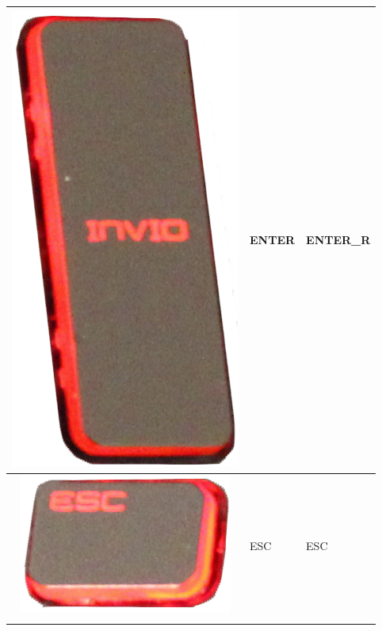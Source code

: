 \begin{longtable}{|cll|}
\begin{minipage}[c]{.3\textwidth}
\includegraphics[scale=0.06]{Images/KeyMapping/ENTER_R}
\vspace{0.2cm}
\end{minipage} & ENTER & ENTER\_R\\
\hline
\begin{minipage}[c]{.3\textwidth}
\vspace{0.2cm}
\includegraphics[scale=0.06]{Images/KeyMapping/ESC}
\vspace{0.2cm}
\end{minipage} & ESC & ESC\\
\hline
\begin{minipage}[c]{.3\textwidth}
\vspace{0.2cm}

\end{minipage}
\end{longtable}
